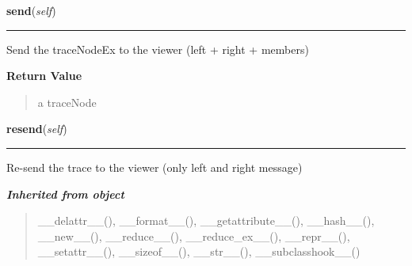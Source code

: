     \label{tracetool:TraceNodeEx:send}

    \vspace{0.5ex}

\hspace{.8\funcindent}\begin{boxedminipage}{\funcwidth}

    \raggedright \textbf{send}(\textit{self})

    \vspace{-1.5ex}

    \rule{\textwidth}{0.5\fboxrule}
\setlength{\parskip}{2ex}
    Send the traceNodeEx to the viewer (left + right + members)

\setlength{\parskip}{1ex}
      \textbf{Return Value}
    \vspace{-1ex}

      \begin{quote}
      a traceNode

      \end{quote}

    \end{boxedminipage}

    \label{tracetool:TraceNodeEx:resend}

    \vspace{0.5ex}

\hspace{.8\funcindent}\begin{boxedminipage}{\funcwidth}

    \raggedright \textbf{resend}(\textit{self})

    \vspace{-1.5ex}

    \rule{\textwidth}{0.5\fboxrule}
\setlength{\parskip}{2ex}
    Re-send the trace to the viewer (only left and right message)

\setlength{\parskip}{1ex}
    \end{boxedminipage}


\large{\textbf{\textit{Inherited from object}}}

\begin{quote}
\_\_delattr\_\_(), \_\_format\_\_(), \_\_getattribute\_\_(), \_\_hash\_\_(), \_\_new\_\_(), \_\_reduce\_\_(), \_\_reduce\_ex\_\_(), \_\_repr\_\_(), \_\_setattr\_\_(), \_\_sizeof\_\_(), \_\_str\_\_(), \_\_subclasshook\_\_()
\end{quote}

